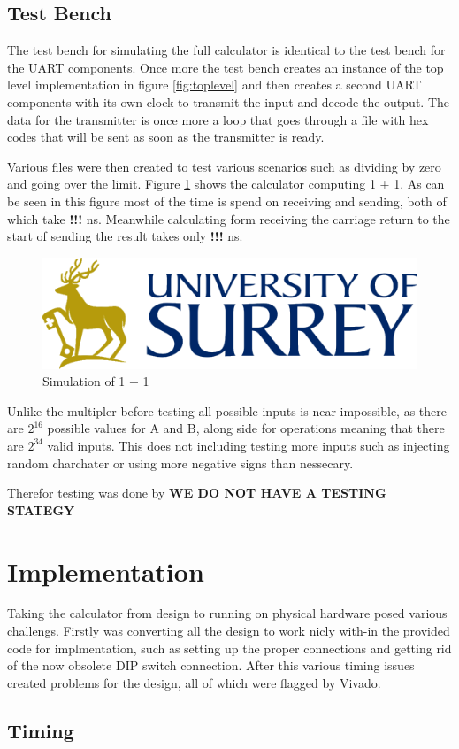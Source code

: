 \documentclass[11pt]{article}
\begin{document}
\subsection{Test Bench}

The test bench for simulating the full calculator is identical to the test bench for the UART components.
Once more the test bench creates an instance of the top level implementation in figure \ref{fig:toplevel}
and then creates a second UART components with its own clock to transmit the input and decode the output.
The data for the transmitter is once more a loop that goes through a file with hex codes that will be sent as soon as the transmitter is ready.

Various files were then created to test various scenarios such as dividing by zero and going over the limit.
Figure \ref{fig:sim} shows the calculator computing 1 + 1.
As can be seen in this figure most of the time is spend on receiving and sending, both of which take \textbf{!!!} ns.
Meanwhile calculating form receiving the carriage return to the start of sending the result takes only \textbf{!!!} ns.

\begin{figure}[H]        
    \centering
    \includegraphics[width=\textwidth]{Logo.png}
    \caption{Simulation of 1 + 1}
    \label{fig:sim}
\end{figure} 

Unlike the multipler before testing all possible inputs is near impossible, as there are $2^{16}$ possible values for A and B, along side for operations meaning that there are $2^{34}$ valid inputs.
This does not including testing more inputs such as injecting random charchater or using more negative signs than nessecary.

Therefor testing was done by \textbf{WE DO NOT HAVE A TESTING STATEGY}


\section{Implementation}

Taking the calculator from design to running on physical hardware posed various challengs.
Firstly was converting all the design to work nicly with-in the provided code for implmentation, such as setting up the proper connections and getting rid of the now obsolete DIP switch connection.
After this various timing issues created problems for the design, all of which were flagged by Vivado. 

\subsection{Timing}

\pagebreak
\printbibliography
\end{document}
